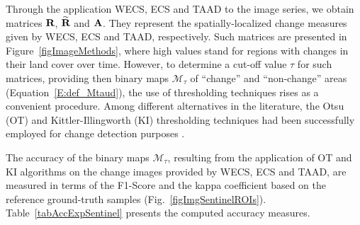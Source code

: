 \documentclass[journal]{IEEEtran}
\newcommand{\vA}{{\textbf A}}
\newcommand{\vR}{{\textbf R}}
\begin{document}
Through the application WECS, ECS and TAAD to the image series, we obtain matrices $\vR$, $\widetilde{\vR}$ and $\vA$. They represent the spatially-localized change measures given by WECS, ECS and TAAD, respectively. Such matrices are presented in Figure~\ref{figImageMethods}, where high values stand for regions with changes in their land cover over time.
%
However, to determine a cut-off value $\tau$ for such matrices, providing then binary maps $\mathcal{M}_{\tau}$ of ``change'' and ``non-change'' areas (Equation~\ref{E:def_Mtaud}), the use of thresholding techniques rises as a convenient procedure. 
Among different alternatives in the literature, the Otsu (OT) \cite{otsu1979threshold} and Kittler-Illingworth (KI) \cite{KittlerIllingworth1986} thresholding techniques had been successfully employed for change detection purposes \cite{JohnsonKasischke1998,Nielsen2007,WuEA2014,NegriEA2021}.


The accuracy of the binary maps $\mathcal{M}_{\tau}$, resulting from the application of OT and KI algorithms on the change images provided by WECS, ECS and TAAD, are measured in terms of the F1-Score and the kappa coefficient based on the reference ground-truth samples (Fig.~\ref{figImgSentinelROIs}). 
Table~\ref{tabAccExpSentinel} presents the computed accuracy measures.
\end{document}
